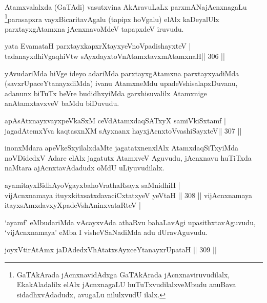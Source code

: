 \begin{artha}
Atamxvalalxda (GaTAdi) vasutxvina AkAravuLaLx parxmANajAcnxnagaLu \footnote{GaTAkArada jAcnxnavidAdxga GaTAkArada jAcnxnaviruvudilalx, EkakAladalilx elAlx jAcnxnagaLU huTuTxvudilalxveMbudu anuBava sidadhxvAdadudx, avugaLu nilulxvudU ilalx.}parasapxra vayxBicaritavAgalu (tapipx hoVgalu) elAlx kaDeyalUlx parxtayxgAtamxna jAcnxnavoMdeV tapapxdeV iruvudu.
\end{artha}

\begin{shl}
yata EvamataH parxtayxkapxrXtayxyeVnoVpadishayxteV | \\
tadanayxdhiVgaqhiVtw sAyxdayxtoV\s nAtamxtavxmAtamxnaH\hfill ||  306 ||  
\end{shl}

\begin{artha}
yAvudariMda hiVge ideyo adariMda parxtayxgAtamxna parxtayxyadiMda (savxrUpaceYtanayxdiMda) ivanu AtamxneMdu upadeVshisalapxDuvanu, adanunx biTuTx beVre budidhxyiMda garxhisuvalilx Atamxnige anAtamxtavxveV baMdu biDuvudu.
\end{artha}

\begin{shl}
apAsAtxnayxvayxpeVkaSxM ceVdAtamxdaqSATxyX samiVkiSxtamf | \\
jagadAtemxYva kaqtasxnXM sAyxnanx hayxjAcnxtoV\s vashiSayxteV\hfill ||  307 ||  
\end{shl}	

\begin{artha}
inonxMdara apeVkeSxyilalxdaMte jagatatxnenxlAlx AtamxdaqSiTxyiMda noVDidedxV Adare elAlx jagatutx AtamxveV Aguvudu, jAcnxnavu huTiTxda naMtara ajAcnxtavAdadudx oMdU uLiyuvudilalx.
\end{artha}


\begin{shl}
ayamitayxBidhAyoVgayxbahoVrathaRsayx saMnidhiH | \\
vijAcnxnamaya ituyxkitxsatxdavaciCxtatxyeV yeVtaH \hfill ||  308 ||  
vijAcnxnamaya itayxsAmxdavxyXpadeVshAninxvataRteV | \\
\end{shl}

\begin{artha}
`ayamf' eMbudariMda vAcayxvAda athaRvu bahaLavAgi upasithxtavAguvudu, `vijAcnxnamaya' eMba I visheVSaNadiMda adu dUravAguvudu.
\end{artha}

\begin{shl}
joyxVtirAtAmx jaDAdedxVhAtatxsAyxceYtanayxrUpataH \hfill||  309 ||  
\end{shl}

